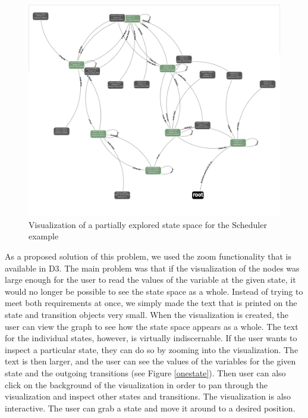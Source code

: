 \begin{center}
\begin{figure}[h!]
\centering
\includegraphics[width=14cm]{bilder/ss.png}
\caption{Visualization of a partially explored state space for the Scheduler example}
\label{zoomedOut}
\end{figure}
\end{center}

As a proposed solution of this problem, we used the zoom functionality that is available in D3. The main problem was that if the visualization of the nodes was large enough for the user to read the values of the variable at the given state, it would no longer be possible to see the state space as a whole. Instead of trying to meet both requirements at once, we simply made the text that is printed on the state and transition objects very small. When the visualization is created, the user can view the graph to see how the state space appears as a whole. The text for the individual states, however, is virtually indiscernable. If the user wants to inspect a particular state, they can do so by zooming into the visualization. The text is then larger, and the user can see the values of the variables for the given state and the outgoing transitions (see Figure \ref{onestate}). Then user can also click on the background of the visualization in order to pan through the visualization and inspect other states and transitions. The visualization is also interactive. The user can grab a state and move it around to a desired position.

